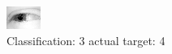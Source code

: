 \begin{figure}[h!]
\begin{center}
\includegraphics[width=0.60\columnwidth]{figures/ID2499_class_3_target_4.png}
\end{center}
\caption{ Classification: 3 actual target: 4}
\label{fig:ID2499_class_3_target_4}
\end{figure}

